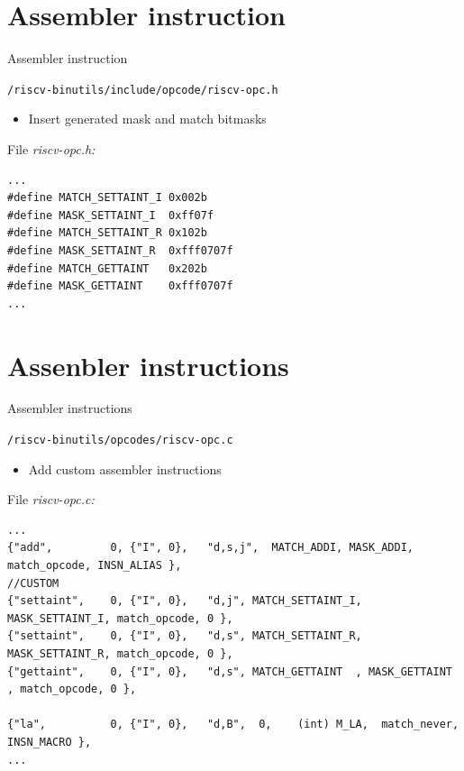 \documentclass[aspectratio=169]{CPS-Beamer}
\begin{document}
\section{Assembler instruction}
\begin{frame}[fragile]{Assembler instruction}
	\begin{block}{\texttt{/riscv-binutils/include/opcode/riscv-opc.h}}
		\begin{itemize}
			\item Insert generated mask and match bitmasks 
		\end{itemize}
File \textit{riscv-opc.h:}
\begin{verbatim}
...
#define MATCH_SETTAINT_I 0x002b
#define MASK_SETTAINT_I  0xff07f
#define MATCH_SETTAINT_R 0x102b
#define MASK_SETTAINT_R  0xfff0707f
#define MATCH_GETTAINT   0x202b
#define MASK_GETTAINT    0xfff0707f
...
\end{verbatim}
	\end{block}
\end{frame}


\section{Assenbler instructions}
\begin{frame}[fragile]{Assembler instructions}
	\begin{block}{\texttt{/riscv-binutils/opcodes/riscv-opc.c}}
		\begin{itemize}
			\item Add custom assembler instructions
		\end{itemize}
File \textit{riscv-opc.c:}
\begin{Verbatim}[fontsize=\footnotesize]
...
{"add",         0, {"I", 0},   "d,s,j",  MATCH_ADDI, MASK_ADDI, match_opcode, INSN_ALIAS },
//CUSTOM
{"settaint",    0, {"I", 0},   "d,j", MATCH_SETTAINT_I, MASK_SETTAINT_I, match_opcode, 0 },
{"settaint",    0, {"I", 0},   "d,s", MATCH_SETTAINT_R, MASK_SETTAINT_R, match_opcode, 0 },
{"gettaint",    0, {"I", 0},   "d,s", MATCH_GETTAINT  , MASK_GETTAINT  , match_opcode, 0 },

{"la",          0, {"I", 0},   "d,B",  0,    (int) M_LA,  match_never, INSN_MACRO },
...
\end{Verbatim}
	\end{block}
\end{frame}
\end{document}
